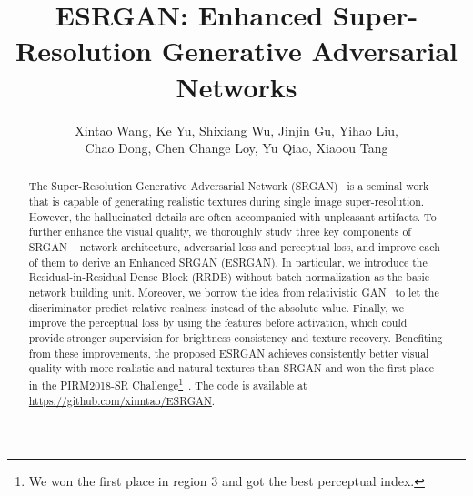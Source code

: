 \documentclass[runningheads]{llncs}
\begin{document}
\pagestyle{headings}
\mainmatter


\title{ESRGAN: Enhanced Super-Resolution Generative Adversarial Networks}



\author{
	Xintao Wang, Ke Yu, Shixiang Wu, Jinjin Gu, Yihao Liu, \\
	Chao Dong, Chen Change Loy, Yu Qiao, Xiaoou Tang
}

\maketitle

\begin{abstract}
	The Super-Resolution Generative Adversarial Network (SRGAN)~\cite{ledig2017photo} is a seminal work that is capable 
	of generating realistic textures during single image super-resolution.
However, the hallucinated details are often accompanied with unpleasant artifacts.
To further enhance the visual quality, we thoroughly study three key components of SRGAN -- network architecture, 
	adversarial loss and perceptual loss, and improve each of them to derive an Enhanced SRGAN (ESRGAN).
In particular, we introduce the Residual-in-Residual Dense Block (RRDB) \mbox{without} batch normalization as the 
	basic network building unit.
Moreover, we borrow the idea from relativistic GAN~\cite{jolicoeur2018relativistic} to let the discriminator 
	predict relative realness instead of the absolute value.
Finally, we improve the perceptual loss by using the features before activation, which could provide stronger 
	supervision for brightness consistency and texture recovery. 
Benefiting from these improvements, the proposed ESRGAN achieves consistently better visual quality with more 
	realistic and natural textures than SRGAN and won the first place in the PIRM2018-SR Challenge\footnote{We 
	won the first place in region 3 and got the best perceptual index.}~\cite{pirm18url}. 
The code is available at \url{https://github.com/xinntao/ESRGAN}.
	
\end{abstract}
\end{document}
